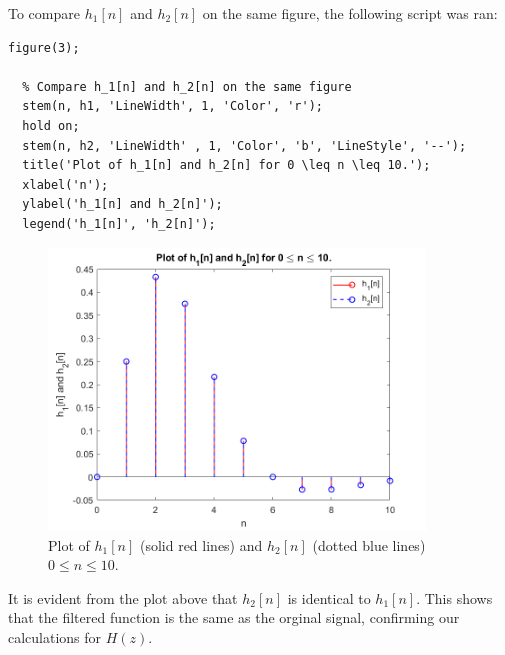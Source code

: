 \documentclass[a4paper, 10pt]{article}
\begin{document}
\hfill

\noindent To compare $h_1[n]$ and $h_2[n]$ on the same figure, the following script was ran:
\begin{lstlisting}[style=Matlab-editor, basicstyle=\small\ttfamily]
  figure(3);

  % Compare h_1[n] and h_2[n] on the same figure
  stem(n, h1, 'LineWidth', 1, 'Color', 'r');
  hold on;
  stem(n, h2, 'LineWidth' , 1, 'Color', 'b', 'LineStyle', '--');
  title('Plot of h_1[n] and h_2[n] for 0 \leq n \leq 10.');
  xlabel('n');
  ylabel('h_1[n] and h_2[n]');
  legend('h_1[n]', 'h_2[n]');
\end{lstlisting}
\begin{figure}[H]
  \centering
  \includegraphics[width=10cm]{images/q1_d.png}
  \caption{Plot of $h_1[n]$ (solid red lines) and $h_2[n]$ (dotted blue lines) $0\leq n\leq 10$.}
\end{figure}
It is evident from the plot above that $h_2[n]$ is identical to $h_1[n]$. This shows that the filtered function is 
the same as the orginal signal, confirming our calculations for $H(z)$.

\end{document}
